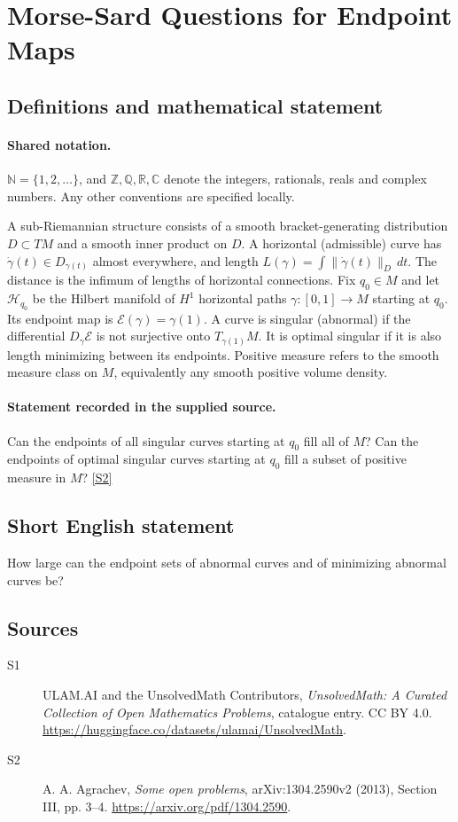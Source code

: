 \documentclass[11pt]{article}
\newcommand{\sref}[2]{\hyperlink{source:#1:#2}{[S#2]}}
\begin{document}
\section{Morse-Sard Questions for Endpoint Maps}\label{statement}

\subsection{Definitions and mathematical statement}

\paragraph{Shared notation.}$\mathbb N=\{1,2,\ldots\}$, and $\mathbb Z,\mathbb Q,\mathbb R,\mathbb C$ denote the integers, rationals, reals and complex numbers. Any other conventions are specified locally.


A sub-Riemannian structure consists of a smooth bracket-generating distribution $D\subset TM$ and a smooth inner product on $D$. A horizontal (admissible) curve has $\dot\gamma(t)\in D_{\gamma(t)}$ almost everywhere, and length $L(\gamma)=\int\|\dot\gamma(t)\|_D\,dt$. The distance is the infimum of lengths of horizontal connections. Fix $q_0\in M$ and let $\mathcal H_{q_0}$ be the Hilbert manifold of $H^1$ horizontal paths $\gamma:[0,1]\to M$ starting at $q_0$. Its endpoint map is $\mathcal E(\gamma)=\gamma(1)$. A curve is singular (abnormal) if the differential $D_\gamma\mathcal E$ is not surjective onto $T_{\gamma(1)}M$. It is optimal singular if it is also length minimizing between its endpoints. Positive measure refers to the smooth measure class on $M$, equivalently any smooth positive volume density.
\paragraph{Statement recorded in the supplied source.}
Can the endpoints of all singular curves starting at $q_0$ fill all of $M$? Can the endpoints of optimal singular curves starting at $q_0$ fill a subset of positive measure in $M$? \sref{statement}{2}
\subsection{Short English statement}
How large can the endpoint sets of abnormal curves and of minimizing abnormal curves be?
\subsection{Sources}
\begin{description}
\item[\hypertarget{source:statement:1}{S1}] ULAM.AI and the UnsolvedMath Contributors, \emph{UnsolvedMath: A Curated Collection of Open Mathematics Problems}, catalogue entry. CC BY 4.0. \url{https://huggingface.co/datasets/ulamai/UnsolvedMath}.
\item[\hypertarget{source:statement:2}{S2}] A. A. Agrachev, \emph{Some open problems}, arXiv:1304.2590v2 (2013), Section III, pp. 3--4. \url{https://arxiv.org/pdf/1304.2590}.
\end{description}
\label{end:statement}
\end{document}
